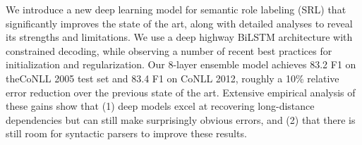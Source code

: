We introduce a new deep learning model for semantic role labeling (SRL) that significantly improves the state of the art, along with detailed analyses to reveal its strengths and limitations. We use a deep highway BiLSTM architecture with constrained decoding, while observing a number of recent best practices for initialization and regularization. Our 8-layer ensemble model achieves 83.2 F1 on theCoNLL 2005 test set and 83.4 F1 on CoNLL 2012, roughly a 10\% relative error reduction over the previous state of the art. Extensive empirical analysis of these gains show that (1) deep models excel at recovering long-distance dependencies but can still make surprisingly obvious errors, and (2) that there is still room for syntactic parsers to improve these results.
